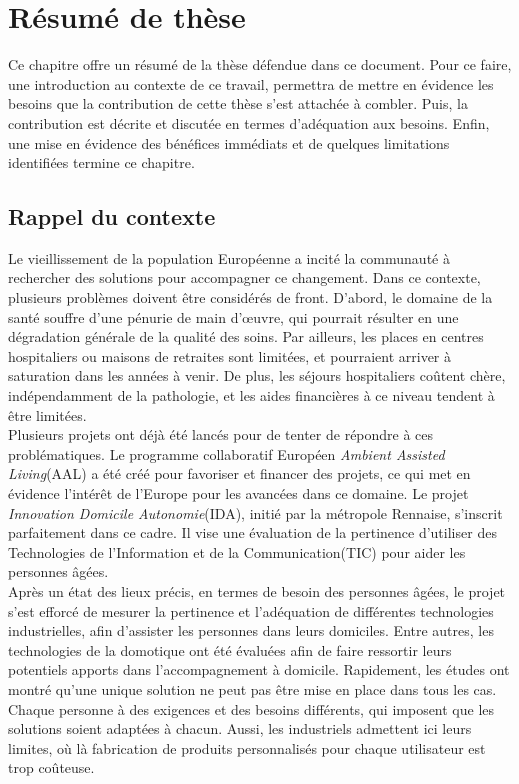 
\chapter{Résumé de thèse}

Ce chapitre offre un résumé de la thèse défendue dans ce document. Pour ce faire, une introduction au contexte de ce travail, permettra de mettre en évidence les besoins que la contribution de cette thèse s'est attachée à combler. Puis, la contribution est décrite et discutée en termes d'adéquation aux besoins. Enfin, une mise en évidence des bénéfices immédiats et de quelques limitations identifiées termine ce chapitre.

\section{Rappel du contexte}

Le vieillissement de la population Européenne a incité la communauté à rechercher des solutions pour accompagner ce changement. Dans ce contexte, plusieurs problèmes doivent être considérés de front. D'abord, le domaine de la santé souffre d'une pénurie de main d'\oe uvre, qui pourrait résulter en une dégradation générale de la qualité des soins. Par ailleurs, les places en centres hospitaliers ou maisons de retraites sont limitées, et pourraient arriver à saturation dans les années à venir. De plus, les séjours hospitaliers coûtent chère, indépendamment de la pathologie, et les aides financières à ce niveau tendent à être limitées.\\
Plusieurs projets ont déjà été lancés pour de tenter de répondre à ces problématiques. Le programme collaboratif Européen {\it Ambient Assisted Living}(AAL) a été créé pour favoriser et financer des projets, ce qui met en évidence l'intérêt de l'Europe pour les avancées dans ce domaine. Le projet {\it Innovation Domicile Autonomie}(IDA), initié par la métropole Rennaise, s'inscrit parfaitement dans ce cadre. Il vise une évaluation de la pertinence d'utiliser des Technologies de l'Information et de la Communication(TIC) pour aider les personnes âgées.\\
Après un état des lieux précis, en termes de besoin des personnes âgées, le projet s'est efforcé de mesurer la pertinence et l'adéquation de différentes technologies industrielles, afin d'assister les personnes dans leurs domiciles. Entre autres, les technologies de la domotique ont été évaluées afin de faire ressortir leurs potentiels apports dans l'accompagnement à domicile. Rapidement, les études ont montré qu'une unique solution ne peut pas être mise en place dans tous les cas. Chaque personne à des exigences et des besoins différents, qui imposent que les solutions soient adaptées à chacun. Aussi, les industriels admettent ici leurs limites, où là fabrication de produits personnalisés pour chaque utilisateur est trop coûteuse.\\

